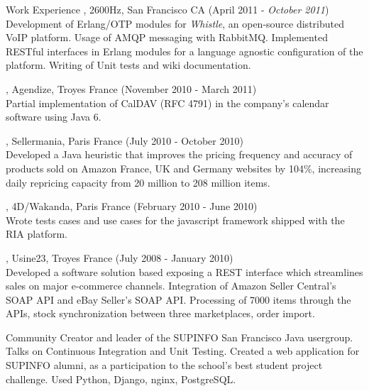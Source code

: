 \documentclass{resume}
\begin{document}
\begin{category}{Work Experience}
, 2600Hz, San Francisco CA (April 2011 - \emph{October 2011})
\\Development of Erlang/OTP modules for \emph{Whistle}, an open-source distributed VoIP platform. Usage of AMQP messaging with RabbitMQ. Implemented RESTful interfaces in Erlang modules for a language agnostic configuration of the platform. Writing of Unit tests and wiki documentation.

, Agendize, Troyes France (November 2010 - March 2011)
\\Partial implementation of CalDAV (RFC 4791) in the company's calendar software using Java 6.

, Sellermania, Paris France (July 2010 - October 2010)
\\Developed a Java heuristic that improves the pricing frequency and accuracy of products sold on Amazon France, UK and Germany websites by 104\%, increasing daily repricing capacity from 20 million to 208 million items.

, 4D/Wakanda, Paris France (February 2010 - June 2010)
\\Wrote tests cases and use cases for the javascript framework shipped with the RIA platform.

, Usine23, Troyes France (July 2008 - January 2010)
\\Developed a software solution based exposing a REST interface which streamlines sales on major e-commerce channels. Integration of Amazon Seller Central's SOAP API and eBay Seller's SOAP API. Processing of 7000 items through the APIs, stock synchronization between three marketplaces, order import.
\end{category}

\begin{category}{Community} 
\citemnobullet Creator and leader of the SUPINFO San Francisco Java usergroup. 
Talks on Continuous Integration and Unit Testing.
\citemnobullet Created a web application for SUPINFO alumni, as a participation to the school's best student project challenge. 
Used Python, Django, nginx, PostgreSQL.
\end{category}
\end{document}
